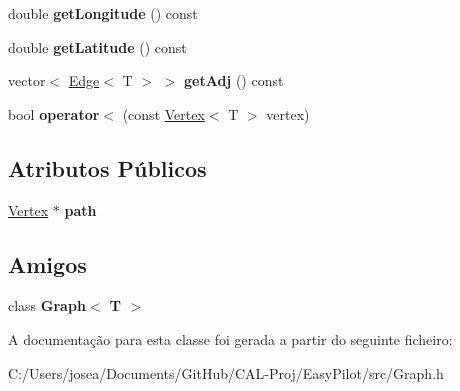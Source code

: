 \begin{DoxyCompactItemize}
\item 
\hypertarget{class_vertex_aa88dbd3c9af86b1fd567a43c0da69017}{}double {\bfseries get\+Longitude} () const \label{class_vertex_aa88dbd3c9af86b1fd567a43c0da69017}

\item 
\hypertarget{class_vertex_afbf6474fe17f4fd509bda1026fd81385}{}double {\bfseries get\+Latitude} () const \label{class_vertex_afbf6474fe17f4fd509bda1026fd81385}

\item 
\hypertarget{class_vertex_a4d8021f4861cc4195af3ecf042a015cc}{}vector$<$ \hyperlink{class_edge}{Edge}$<$ T $>$ $>$ {\bfseries get\+Adj} () const \label{class_vertex_a4d8021f4861cc4195af3ecf042a015cc}

\item 
\hypertarget{class_vertex_a7091b26f281a5041b1775a3d3f9cb7a6}{}bool {\bfseries operator$<$} (const \hyperlink{class_vertex}{Vertex}$<$ T $>$ vertex)\label{class_vertex_a7091b26f281a5041b1775a3d3f9cb7a6}

\end{DoxyCompactItemize}
\subsection*{Atributos Públicos}
\begin{DoxyCompactItemize}
\item 
\hypertarget{class_vertex_abd40febd917aa25add6bd42237c8463a}{}\hyperlink{class_vertex}{Vertex} $\ast$ {\bfseries path}\label{class_vertex_abd40febd917aa25add6bd42237c8463a}

\end{DoxyCompactItemize}
\subsection*{Amigos}
\begin{DoxyCompactItemize}
\item 
\hypertarget{class_vertex_aefa9b76cd57411c5354e5620dc2d84dd}{}class {\bfseries Graph$<$ T $>$}\label{class_vertex_aefa9b76cd57411c5354e5620dc2d84dd}

\end{DoxyCompactItemize}


A documentação para esta classe foi gerada a partir do seguinte ficheiro\+:\begin{DoxyCompactItemize}
\item 
C\+:/\+Users/josea/\+Documents/\+Git\+Hub/\+C\+A\+L-\/\+Proj/\+Easy\+Pilot/src/Graph.\+h\end{DoxyCompactItemize}
